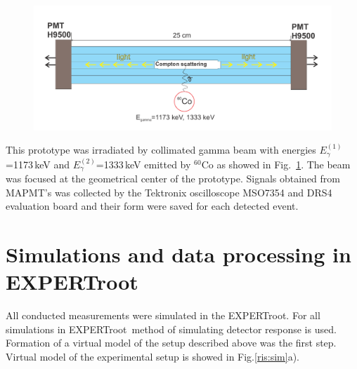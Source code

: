 \documentclass{webofc}
\newcommand{\er}{\textmd{EXPERTroot}}
\begin{document}
\begin{figure}[h]
	\centering
	\includegraphics[width=1\linewidth]{NeuRadexperiment.png}
	\label{ris:neuradexp}
\end{figure}

This prototype was irradiated by collimated gamma beam with energies $E^{(1)}_{\gamma}$=1173\,keV and $E^{(2)}_{\gamma}$=1333\,keV emitted by $^{60}$Co as showed in Fig.~\ref{ris:neuradexp}. The beam was focused at the geometrical center of the prototype. Signals obtained from MAPMT's was collected by the Tektronix oscilloscope MSO7354 and DRS4 evaluation board and their form were saved for each detected event.

\section{Simulations and data processing in EXPERTroot}

All conducted measurements were simulated in the \er. For all simulations in \er\, method of simulating detector response \cite{er} is used.
Formation of a virtual model of the setup described above was the first step.
Virtual model of the experimental setup is showed in Fig.\ref{ris:sim}a). 
	
\end{document}

